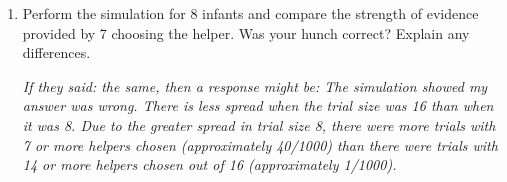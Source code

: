 \begin{enumerate}
\begin{enumerate}
\begin{key}
{\it
      Change the number of trials to
      8 instead of 16.   }
\end{key}
\item Perform the simulation for 8 infants and compare the
      strength of evidence provided by 7 choosing the helper.  Was your
      hunch correct?  Explain any differences.      
\begin{students}
        \vspace{3.5cm}
\end{students}

\begin{key}
{\it
      If they said: the same, then a response might be:
      The simulation showed my answer was wrong.  There is less
      spread when the trial size was 16 than when it was 8.  Due to
      the greater spread in trial size 8, there were more trials
      with 7 or more helpers chosen (approximately 40/1000) than
      there were trials with 14 or more helpers chosen out of 16
      (approximately 1/1000). }
\end{key}
\end{enumerate}



\end{enumerate}
